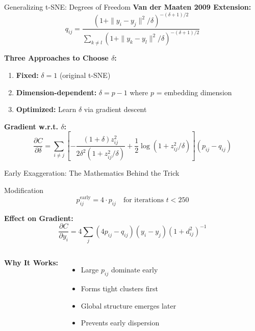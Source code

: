 \begin{frame}{Generalizing t-SNE: Degrees of Freedom}
\textbf{Van der Maaten 2009 Extension:}
$$q_{ij} = \frac{(1 + \|y_i - y_j\|^2/\delta)^{-(\delta+1)/2}}{\sum_{k \neq l}(1 + \|y_k - y_l\|^2/\delta)^{-(\delta+1)/2}}$$

\textbf{Three Approaches to Choose $\delta$:}
\begin{enumerate}
\item \textbf{Fixed:} $\delta = 1$ (original t-SNE)
\item \textbf{Dimension-dependent:} $\delta = p - 1$ where $p$ = embedding dimension
\item \textbf{Optimized:} Learn $\delta$ via gradient descent
\end{enumerate}

\textbf{Gradient w.r.t. $\delta$:}
$$\frac{\partial C}{\partial \delta} = \sum_{i \neq j} \left[-\frac{(1+\delta)z_{ij}^2}{2\delta^2(1 + z_{ij}^2/\delta)} + \frac{1}{2}\log(1 + z_{ij}^2/\delta)\right](p_{ij} - q_{ij})$$
\end{frame}


\begin{frame}{Early Exaggeration: The Mathematics Behind the Trick}
\begin{block}{Modification}
$$p_{ij}^{\text{early}} = 4 \cdot p_{ij} \quad \text{for iterations } t < 250$$
\end{block}

\textbf{Effect on Gradient:}
$$\frac{\partial C}{\partial y_i} = 4\sum_j (4p_{ij} - q_{ij})(y_i - y_j)(1 + d_{ij}^2)^{-1}$$

\begin{columns}
\textbf{Why It Works:}
\begin{itemize}
\item Large $p_{ij}$ dominate early
\item Forms tight clusters first
\item Global structure emerges later
\item Prevents early dispersion
\end{itemize}

\begin{center}
\end{center}
\end{columns}
\end{frame}

